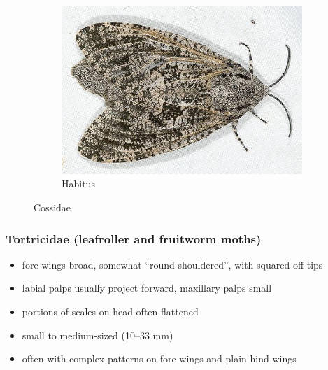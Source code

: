 \documentclass[letterpaper, 11pt]{article}
\begin{document}
\begin{figure}[ht!]
\begin{subfigure}[ht!]{0.48\textwidth}
        \includegraphics[width=\textwidth]{image43}
        \caption{Habitus}
        \label{fig:cossid2}
    \end{subfigure}
    \caption{Cossidae}\label{fig:cossids}
\end{figure}

\subsubsection{Tortricidae (leafroller and fruitworm moths)}
\begin{itemize}
\item fore wings broad, somewhat ``round-shouldered'', with squared-off tips
\item labial palps usually project forward, maxillary palps small
\item portions of scales on head often flattened
\item small to medium-sized (10--33 mm)
\item often with complex patterns on fore wings and plain hind wings
\end{itemize}
\end{document}

